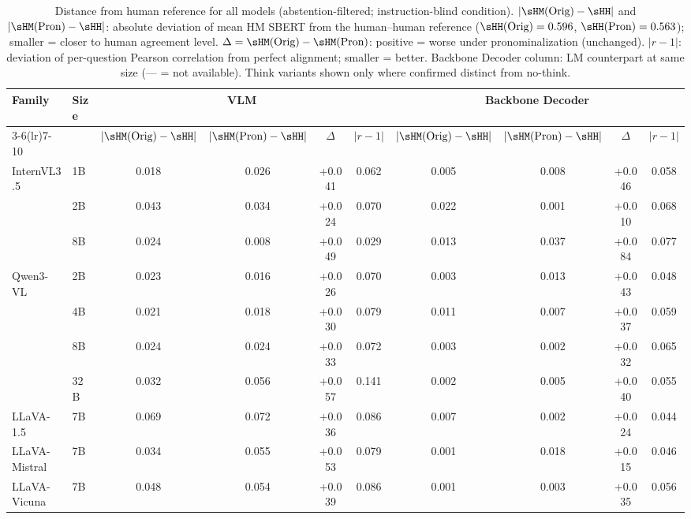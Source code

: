 \begin{table}[t]
\centering
\scriptsize
\setlength{\tabcolsep}{3.5pt}
\renewcommand{\arraystretch}{1.05}
\caption{Distance from human reference for all models (abstention-filtered; instruction-blind condition). $|\sHM(\text{Orig}) - \sHH|$ and $|\sHM(\text{Pron}) - \sHH|$: absolute deviation of mean HM SBERT from the human--human reference ($\sHH(\text{Orig})=0.596$, $\sHH(\text{Pron})=0.563$); smaller = closer to human agreement level. $\Delta = \sHM(\text{Orig})-\sHM(\text{Pron})$: positive = worse under pronominalization (unchanged). $|r - 1|$: deviation of per-question Pearson correlation from perfect alignment; smaller = better. Backbone Decoder column: LM counterpart at same size ({\scriptsize ---} = not available). Think variants shown only where confirmed distinct from no-think.}
\label{tab:scale_alignment_full}
\begin{tabular}{llcccc|cccc}
\toprule
\multirow{2}{*}{\textbf{Family}} & \multirow{2}{*}{\textbf{Size}} & \multicolumn{4}{c|}{\textbf{VLM}} & \multicolumn{4}{c}{\textbf{Backbone Decoder}} \\
\cmidrule(lr){3-6}\cmidrule(lr){7-10}
 & & $|\sHM(\text{Orig}) - \sHH|$ & $|\sHM(\text{Pron}) - \sHH|$ & $\Delta$ & $|r - 1|$ & $|\sHM(\text{Orig}) - \sHH|$ & $|\sHM(\text{Pron}) - \sHH|$ & $\Delta$ & $|r - 1|$ \\
\midrule
\multirow{3}{*}{InternVL3.5} & 1B & 0.018 & 0.026 & +0.041 & 0.062 & 0.005 & 0.008 & +0.046 & 0.058 \\
 & 2B & 0.043 & 0.034 & +0.024 & 0.070 & 0.022 & 0.001 & +0.010 & 0.068 \\
 & 8B & 0.024 & 0.008 & +0.049 & 0.029 & 0.013 & 0.037 & +0.084 & 0.077 \\
\midrule
\multirow{4}{*}{Qwen3-VL} & 2B & 0.023 & 0.016 & +0.026 & 0.070 & 0.003 & 0.013 & +0.043 & 0.048 \\
 & 4B & 0.021 & 0.018 & +0.030 & 0.079 & 0.011 & 0.007 & +0.037 & 0.059 \\
 & 8B & 0.024 & 0.024 & +0.033 & 0.072 & 0.003 & 0.002 & +0.032 & 0.065 \\
 & 32B & 0.032 & 0.056 & +0.057 & 0.141 & 0.002 & 0.005 & +0.040 & 0.055 \\
\midrule
\multirow{1}{*}{LLaVA-1.5} & 7B & 0.069 & 0.072 & +0.036 & 0.086 & 0.007 & 0.002 & +0.024 & 0.044 \\
\midrule
\multirow{1}{*}{LLaVA-Mistral} & 7B & 0.034 & 0.055 & +0.053 & 0.079 & 0.001 & 0.018 & +0.015 & 0.046 \\
\midrule
\multirow{2}{*}{LLaVA-Vicuna} & 7B & 0.048 & 0.054 & +0.039 & 0.086 & 0.001 & 0.003 & +0.035 & 0.056 \\

\end{tabular}
\end{table}
